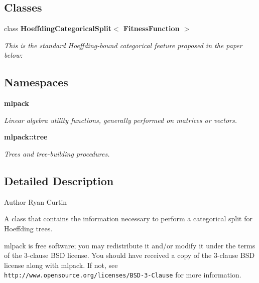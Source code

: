 \subsection*{Classes}
\begin{DoxyCompactItemize}
\item 
class \textbf{ Hoeffding\+Categorical\+Split$<$ Fitness\+Function $>$}
\begin{DoxyCompactList}\small\item\em This is the standard Hoeffding-\/bound categorical feature proposed in the paper below\+: \end{DoxyCompactList}\end{DoxyCompactItemize}
\subsection*{Namespaces}
\begin{DoxyCompactItemize}
\item 
 \textbf{ mlpack}
\begin{DoxyCompactList}\small\item\em Linear algebra utility functions, generally performed on matrices or vectors. \end{DoxyCompactList}\item 
 \textbf{ mlpack\+::tree}
\begin{DoxyCompactList}\small\item\em Trees and tree-\/building procedures. \end{DoxyCompactList}\end{DoxyCompactItemize}


\subsection{Detailed Description}
\begin{DoxyAuthor}{Author}
Ryan Curtin
\end{DoxyAuthor}
A class that contains the information necessary to perform a categorical split for Hoeffding trees.

mlpack is free software; you may redistribute it and/or modify it under the terms of the 3-\/clause B\+SD license. You should have received a copy of the 3-\/clause B\+SD license along with mlpack. If not, see {\tt http\+://www.\+opensource.\+org/licenses/\+B\+S\+D-\/3-\/\+Clause} for more information. 